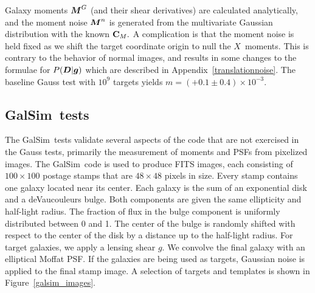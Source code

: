 \documentclass[11pt,preprint,flushrt]{aastex}
\newcommand{\vecD}{\mbox{\boldmath $D$}}
\newcommand{\vecX}{\mbox{\boldmath $X$}}
\newcommand{\vecg}{\mbox{\boldmath $g$}}
\newcommand{\vecM}{\mbox{\boldmath $M$}}
\newcommand{\matC}{\mbox{$\bf C$}}
\newcommand{\galsim}{{\sc GalSim}}
\begin{document}
Galaxy moments $\vecM^G$ (and their shear derivatives) are calculated
analytically, and the moment noise $\vecM^n$ is generated from the
multivariate Gaussian distribution with the known $\matC_M.$ A
complication is that the moment noise is held fixed as we shift the
target coordinate origin to null the \vecX\ moments.  This is contrary
to the behavior of normal images, and results in some changes to the
formulae for $P(\vecD | \vecg)$ which are described in
Appendix~\ref{translationnoise}. The baseline Gauss test with $10^9$ targets yields 
$m=(+0.1\pm0.4) \times10^{-3}.$


\subsection{\galsim\ tests}
\label{galsimsec}
The \galsim\ tests validate several aspects of the code that are not
exercised in the Gauss tests, primarily the measurement of moments and 
PSFs from pixelized images.  The \galsim\ code is used to produce
FITS images, each consisting of $100\times100$ postage stamps that are 
$48\times48$ pixels in size. Every stamp
contains one galaxy located near its center. Each galaxy is the sum of
an exponential disk and a deVaucouleurs bulge. Both components are
given the same ellipticity and half-light radius. The fraction of flux
in the bulge component is uniformly distributed between 0 and 1.
The center of
the bulge is randomly shifted with respect to the center of the disk
by a distance up to the half-light radius. 
For target galaxies, we apply a lensing shear \vecg.
We convolve the final galaxy with an elliptical Moffat PSF. 
If the galaxies are being used as targets,
Gaussian noise is applied to the final stamp image. 
A selection of targets and templates is shown in Figure~\ref{galsim_images}.
 
\end{document}
